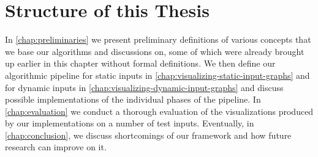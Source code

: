 \section{Structure of this Thesis}
\label{sect:structure-of-this-thesis}

In \cref{chap:preliminaries} we present preliminary definitions of various concepts that we base our algorithms and discussions on, some of which were already brought up earlier in this chapter without formal definitions. We then define our algorithmic pipeline for static inputs in \cref{chap:visualizing-static-input-graphs} and for dynamic inputs in \cref{chap:visualizing-dynamic-input-graphs} and discuss possible implementations of the individual phases of the pipeline. In \cref{chap:evaluation} we conduct a thorough evaluation of the visualizations produced by our implementations on a number of test inputs. Eventually, in \cref{chap:conclusion}, we discuss shortcomings of our framework and how future research can improve on it.
